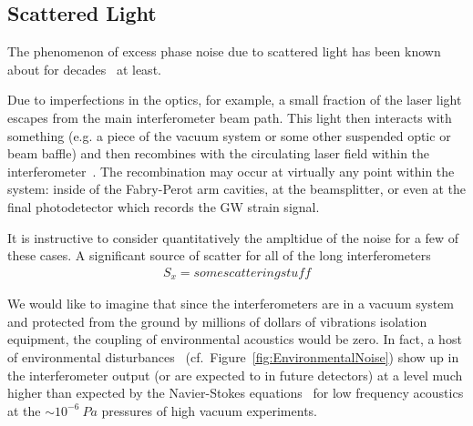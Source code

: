 %


\subsection{Scattered Light}
\label{s:IDC:scatter}
The phenomenon of excess phase noise due to scattered light has been known about for
decades~\cite{Schilling:1981} at least.

Due to imperfections in the optics, for example, a small fraction of the laser light escapes from
the main interferometer beam path. This light then interacts with something (e.g. a piece of the
vacuum system or some other suspended optic or beam baffle) and then recombines with the
circulating laser field within the
interferometer~\cite{Kip:Scatter95, Kip:scatter1989, Sam:Scatter2012,
Stefano:Scatter, vinet1997scattered, fritschel1998high}.
The recombination may occur at virtually any point within the system: inside of the
Fabry-Perot arm cavities, at the beamsplitter, or even at the final photodetector which
records the GW strain signal.

It is instructive to consider quantitatively the ampltidue of the noise for a few of
these cases. A significant source of scatter for all of the long interferometers
\begin{align}
S_x = some scattering stuff
\end{align}

We would like to imagine that since the interferometers are in a vacuum system and
protected from the ground by millions of dollars of vibrations isolation equipment,
the coupling of environmental acoustics would be zero. In fact, a host of environmental
disturbances~\cite{Effler:2015hw} (cf.~Figure~\ref{fig:EnvironmentalNoise}) show up in the interferometer
output (or are expected to in future detectors) at a level much higher than
expected by the Navier-Stokes equations~\cite{Greenspan:sound} for low frequency
acoustics at the $\sim10^{-6}~Pa$ pressures of high vacuum experiments.




